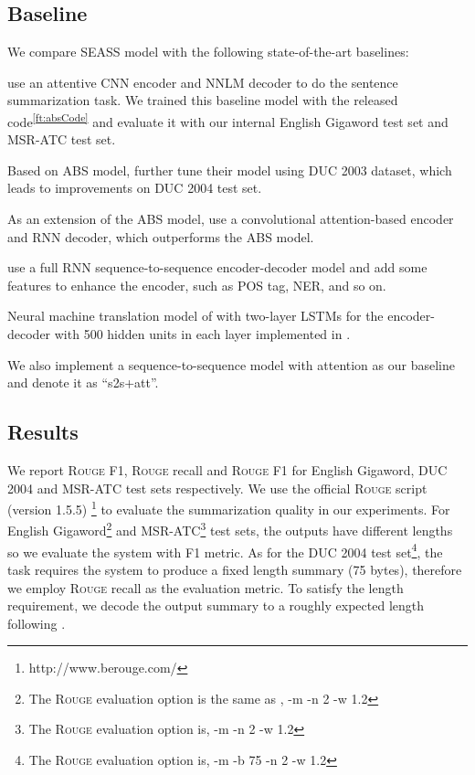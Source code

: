 \documentclass[11pt,a4paper]{article}
\newcommand{\ourModelName}{SEASS}
\begin{document}
\subsection{Baseline}

We compare \ourModelName{} model with the following state-of-the-art baselines:
\begin{description}[noitemsep]
	\item[ABS] \citet{rush-chopra-weston:2015:EMNLP} use an attentive CNN encoder and NNLM decoder to do the sentence summarization task.
	We trained this baseline model with the released code\textsuperscript{\ref{ft:absCode}} and evaluate it with our internal English Gigaword test set and MSR-ATC test set. 
	\item[ABS+] Based on ABS model, \citet{rush-chopra-weston:2015:EMNLP} further tune their model using DUC 2003 dataset, which leads to improvements on DUC 2004 test set.
	\item[CAs2s] As an extension of the ABS model, \citet{chopra-auli-rush:2016:N16-1} use a convolutional attention-based encoder and RNN decoder, which outperforms the ABS model.
	\item[Feats2s] \citet{nallapatiabstractive} use a full RNN sequence-to-sequence encoder-decoder model and add some features to enhance the encoder, such as POS tag, NER, and so on.
	\item[Luong-NMT] Neural machine translation model of \citet{luong-pham-manning:2015:EMNLP} with two-layer LSTMs for the encoder-decoder with 500 hidden units in each layer implemented in \cite{chopra-auli-rush:2016:N16-1}. 
	\item[s2s+att] We also implement a sequence-to-sequence model with attention as our baseline and denote it as ``s2s+att''.
\end{description}


\subsection{Results}
We report \textsc{Rouge} F1, \textsc{Rouge} recall and \textsc{Rouge} F1 for English Gigaword, DUC 2004 and MSR-ATC test sets respectively.
We use the official \textsc{Rouge} script (version 1.5.5) \footnote{http://www.berouge.com/} to evaluate the summarization quality in our experiments.
For English Gigaword\footnote{The \textsc{Rouge} evaluation option is the same as \citet{rush-chopra-weston:2015:EMNLP}, -m -n 2 -w 1.2} and MSR-ATC\footnote{The \textsc{Rouge} evaluation option is, -m -n 2 -w 1.2} test sets, the outputs have different lengths so we evaluate the system with F1 metric.
As for the DUC 2004 test set\footnote{The \textsc{Rouge} evaluation option is, -m -b 75 -n 2 -w 1.2}, the task requires the system to produce a fixed length summary (75 bytes), therefore we employ \textsc{Rouge} recall as the evaluation metric.
To satisfy the length requirement,  we decode the output summary to a roughly expected length following \citet{rush-chopra-weston:2015:EMNLP}.
\end{document}
